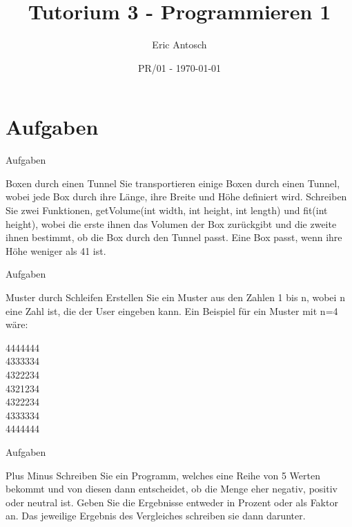 \documentclass[usenames,dvipsnames,10pt]{beamer}
\title{Tutorium 3 - Programmieren 1}
\date[ISPN ’80]{PR/01 - \today}
\author{Eric Antosch}
\begin{document}
    
    \begin{frame}
        \titlepage
    \end{frame}    
    \section{Aufgaben}
    \begin{frame}{Aufgaben}
        \begin{block}{Boxen durch einen Tunnel}
          Sie transportieren einige Boxen durch einen Tunnel, wobei jede Box durch ihre Länge, ihre Breite und Höhe definiert wird. Schreiben Sie zwei Funktionen, getVolume(int width, int height, int length) und fit(int height), wobei die erste ihnen das Volumen der Box zurückgibt und die zweite ihnen bestimmt, ob die Box durch den Tunnel passt. Eine Box passt, wenn ihre Höhe weniger als 41 ist.
        \end{block}
    \end{frame}
    \begin{frame}{Aufgaben}
        \begin{block}{Muster durch Schleifen}
          Erstellen Sie ein Muster aus den Zahlen 1 bis n, wobei n eine Zahl ist, die der User eingeben kann.
          Ein Beispiel für ein Muster mit n=4 wäre:
          \begin{center}
            4444444\\
            4333334\\
            4322234\\
            4321234\\
            4322234\\
            4333334\\
            4444444
          \end{center}
        \end{block}
    \end{frame}

    \begin{frame}{Aufgaben}
      \begin{block}{Plus Minus}
        Schreiben Sie ein Programm, welches eine Reihe von 5 Werten bekommt und von diesen dann entscheidet, ob die Menge eher negativ, positiv oder neutral ist. Geben Sie die Ergebnisse entweder in Prozent oder als Faktor an.
        Das jeweilige Ergebnis des Vergleiches schreiben sie dann darunter.
        \end{block}
      \end{frame}
\end{document}
